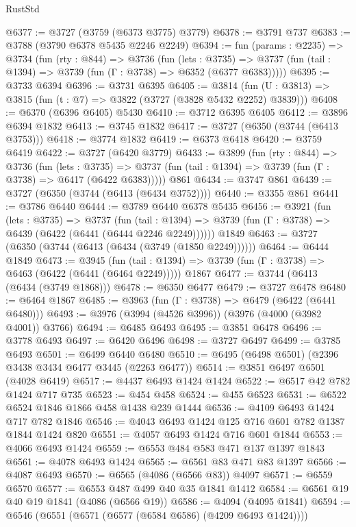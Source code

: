 \begin{lexlean}{RustStd}
\begin{coremodule}
@6377 := @3727 (@3759 (@6373 @3775) @3779)
@6378 := @3791 @737
@6383 := @3788 (@3790 @6378 @5435 @2246 @2249)
@6394 := fun (params : @2235) =>
  @3734
    (fun (rty : @844) =>
    @3736
      (fun (lets : @3735) =>
      @3737 (fun (tail : @1394) => @3739 (fun (Γ : @3738) => @6352 (@6377 @6383)))))
@6395 := @3733 @6394
@6396 := @3731 @6395
@6405 := @3814 (fun (U : @3813) => @3815 (fun (t : @7) => @3822 (@3727 (@3828 @5432 @2252) @3839)))
@6408 := @6370 (@6396 @6405) @5430
@6410 := @3712 @6395 @6405
@6412 := @3896 @6394 @1832
@6413 := @3745 @1832
@6417 := @3727 (@6350 (@3744 (@6413 @3753)))
@6418 := @3774 @1832
@6419 := @6373 @6418
@6420 := @3759 @6419
@6422 := @3727 (@6420 @3779)
@6433 := @3899
    (fun (rty : @844) =>
    @3736
      (fun (lets : @3735) =>
      @3737 (fun (tail : @1394) => @3739 (fun (Γ : @3738) => @6417 (@6422 @6383)))))
    @861
@6434 := @3747 @861
@6439 := @3727 (@6350 (@3744 (@6413 (@6434 @3752))))
@6440 := @3355 @861
@6441 := @3786 @6440
@6444 := @3789 @6440 @6378 @5435
@6456 := @3921
    (fun (lets : @3735) =>
    @3737
      (fun (tail : @1394) => @3739 (fun (Γ : @3738) => @6439 (@6422 (@6441 (@6444 @2246 @2249))))))
    @1849
@6463 := @3727 (@6350 (@3744 (@6413 (@6434 (@3749 (@1850 @2249))))))
@6464 := @6444 @1849
@6473 := @3945
    (fun (tail : @1394) => @3739 (fun (Γ : @3738) => @6463 (@6422 (@6441 (@6464 @2249)))))
    @1867
@6477 := @3744 (@6413 (@6434 (@3749 @1868)))
@6478 := @6350 @6477
@6479 := @3727 @6478
@6480 := @6464 @1867
@6485 := @3963 (fun (Γ : @3738) => @6479 (@6422 (@6441 @6480)))
@6493 := @3976 (@3994 (@4526 @3996)) (@3976 (@4000 (@3982 @4001)) @3766)
@6494 := @6485 @6493
@6495 := @3851 @6478
@6496 := @3778 @6493
@6497 := @6420 @6496
@6498 := @3727 @6497
@6499 := @3785 @6493
@6501 := @6499 @6440 @6480
@6510 := @6495 (@6498 @6501) (@2396 @3438 @3434 @6477 @3445 (@2263 @6477))
@6514 := @3851 @6497 @6501 (@4028 @6419)
@6517 := @4437 @6493 @1424 @1424
@6522 := @6517 @42 @782 @1424 @717 @735
@6523 := @454 @458
@6524 := @455 @6523
@6531 := @6522 @6524 @1846 @1866 @458 @1438 @239 @1444
@6536 := @4109 @6493 @1424 @717 @782 @1846
@6546 := @4043 @6493 @1424 @125 @716 @601 @782 @1387 @1844 @1424 @820
@6551 := @4057 @6493 @1424 @716 @601 @1844
@6553 := @4066 @6493 @1424
@6559 := @6553 @484 @583 @471 @137 @1397 @1843
@6561 := @4078 @6493 @1424
@6565 := @6561 @83 @471 @83 @1397
@6566 := @4087 @6493
@6570 := @6565 (@4086 (@6566 @83)) @4097
@6571 := @6559 @6570
@6577 := @6553 @487 @499 @40 @35 @1841 @1412
@6584 := @6561 @19 @40 @19 @1841 (@4086 (@6566 @19))
@6586 := @4094 (@4095 @1841)
@6594 := @6546 (@6551 (@6571 (@6577 (@6584 @6586) (@4209 @6493 @1424))))

\end{coremodule}
\end{lexlean}
